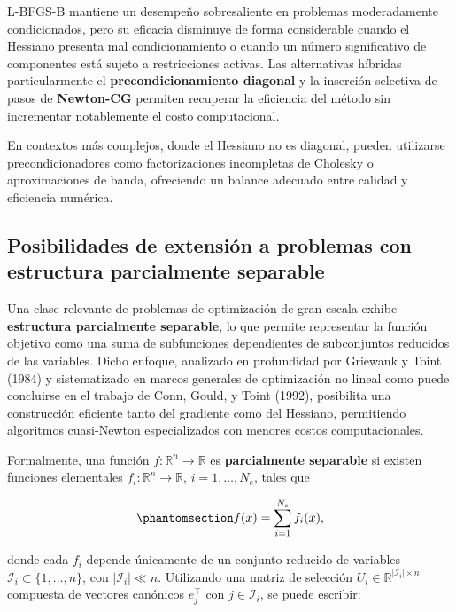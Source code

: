\documentclass[
  spanish,
  us-letterpaper,
]{scrreprt}
\numberwithin{equation}{section}
\begin{document}
L-BFGS-B mantiene un desempeño sobresaliente en problemas moderadamente
condicionados, pero su eficacia disminuye de forma considerable cuando
el Hessiano presenta mal condicionamiento o cuando un número
significativo de componentes está sujeto a restricciones activas. Las
alternativas híbridas particularmente el \textbf{precondicionamiento
diagonal} y la inserción selectiva de pasos de \textbf{Newton-CG}
permiten recuperar la eficiencia del método sin incrementar notablemente
el costo computacional.

En contextos más complejos, donde el Hessiano no es diagonal, pueden
utilizarse precondicionadores como factorizaciones incompletas de
Cholesky o aproximaciones de banda, ofreciendo un balance adecuado entre
calidad y eficiencia numérica.

\subsection{Posibilidades de extensión a problemas con estructura
parcialmente separable}\label{sec-parcialmenteS}

Una clase relevante de problemas de optimización de gran escala exhibe
\textbf{estructura parcialmente separable}, lo que permite representar
la función objetivo como una suma de subfunciones dependientes de
subconjuntos reducidos de las variables. Dicho enfoque, analizado en
profundidad por Griewank y Toint (1984) y sistematizado en marcos
generales de optimización no lineal como puede concluirse en el trabajo
de Conn, Gould, y Toint (1992), posibilita una construcción eficiente
tanto del gradiente como del Hessiano, permitiendo algoritmos
cuasi-Newton especializados con menores costos computacionales.

Formalmente, una función \(f:\mathbb{R}^n \to \mathbb{R}\) es
\textbf{parcialmente separable} si existen funciones elementales
\(f_i:\mathbb{R}^n\to\mathbb{R}\), \(i=1,\dots,N_e\), tales que

\begin{equation}\phantomsection\label{eq-140}{
f(x) = \sum_{i=1}^{N_e} f_i(x),
}\end{equation}

donde cada \(f_i\) depende únicamente de un conjunto reducido de
variables \(\mathcal{I}_i \subset \{1,\dots,n\}\), con
\(|\mathcal{I}_i|\ll n\). Utilizando una matriz de selección
\(U_i\in\mathbb{R}^{|\mathcal{I}_i|\times n}\) compuesta de vectores
canónicos \(e_j^\top\) con \(j\in\mathcal{I}_i\), se puede escribir:
\end{document}

